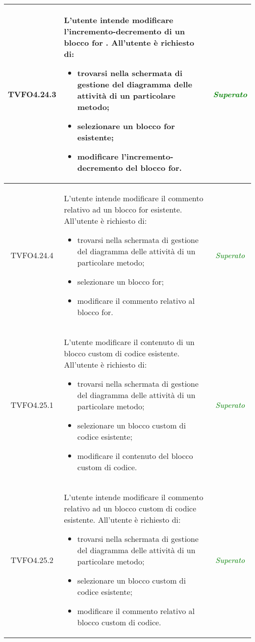\begin{longtable}{|c|>{}m{8cm}|c|}
\hypertarget{TVFO4.24.3}{TVFO4.24.3} & L'utente intende modificare l'incremento-decremento di un blocco for .
All'utente è richiesto di:
\begin{itemize}
	\item trovarsi nella schermata di gestione del diagramma delle attività di un particolare metodo;
	\item selezionare un blocco for esistente;
	\item modificare l'incremento-decremento del blocco for.
\end{itemize} & \textcolor{Green}{\textit{Superato}}\\ \hline

\hypertarget{TVFO4.24.4}{TVFO4.24.4} & L'utente intende modificare il commento relativo ad un blocco for esistente.
All'utente è richiesto di:
\begin{itemize}
	\item trovarsi nella schermata di gestione del diagramma delle attività di un particolare metodo;
	\item selezionare un blocco for;
	\item modificare il commento relativo al blocco for.
\end{itemize} & \textcolor{Green}{\textit{Superato}}\\ \hline

\hypertarget{TVFO4.25.1}{TVFO4.25.1} & L'utente modificare il contenuto di un blocco custom di codice esistente.
All'utente è richiesto di:
\begin{itemize}
	\item trovarsi nella schermata di gestione del diagramma delle attività di un particolare metodo;
	\item selezionare un blocco custom di codice esistente;
	\item modificare il contenuto del blocco custom di codice.
\end{itemize} & \textcolor{Green}{\textit{Superato}}\\ \hline

\hypertarget{TVFO4.25.2}{TVFO4.25.2} & L'utente intende modificare il commento relativo ad un blocco custom di codice esistente.
All'utente è richiesto di:
\begin{itemize}
	\item trovarsi nella schermata di gestione del diagramma delle attività di un particolare metodo;
	\item selezionare un blocco custom di codice esistente;
	\item modificare il commento relativo al blocco custom di codice.
\end{itemize} & \textcolor{Green}{\textit{Superato}}\\ \hline


\end{longtable}
